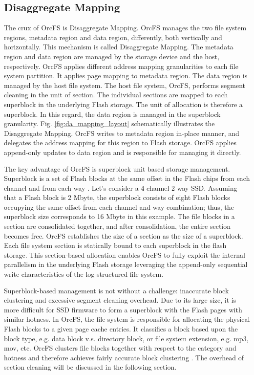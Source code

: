 \documentclass[pageno]{jpaper}
\begin{document}
\subsection{Disaggregate Mapping}
\label{subsec:da_mapping}

The crux of OrcFS is Disaggregate Mapping. OrcFS manages the two file
system regions, metadata region and data region, differently, both
vertically and horizontally. This mechanism is
called Disaggregate Mapping. The metadata region and data region are managed by
the storage device and the host, respectively. OrcFS applies different
address mapping granularities to each file system partition. It applies
page mapping to metadata region. The data region is
managed by the host file system. The host file system, OrcFS, performs
segment cleaning in the unit of section. The individual sections are
mapped to each superblock in the underlying Flash storage. The unit of
allocation is therefore a superblock. In this regard, the data region is
managed in the superblock granularity. Fig. \ref{fig:da_mapping_layout}
schematically illustrates the Disaggregate Mapping. OrcFS writes to 
metadata region in-place manner, and delegates the address mapping for
this region to Flash storage. OrcFS applies append-only updates to data
region and is responsible for managing it directly. 

The key advantage of OrcFS is superblock unit based storage
management.  Superblock is a set of Flash blocks at the same offset in
the Flash chips from each channel and from each way
\cite{park2009sub}.  Let's consider a 4 channel 2 way SSD. Assuming that a
Flash block is 2 Mbyte, the superblock consists of eight Flash blocks
occupying the same offset from each channel and way combination; thus, the
superblock size corresponds to 16 Mbyte in this example. The file
blocks in a section are consolidated together, and after
consolidation, the entire section becomes free. OrcFS establishes the
size of a section as the size of a superblock. Each file system section
is statically bound to each superblock in the flash storage. This
section-based allocation enables OrcFS to fully exploit the internal
parallelism in the underlying Flash storage leveraging the append-only
sequential write characteristics of the log-structured file system.

Superblock-based management is not without a challenge: inaccurate
block clustering and excessive segment cleaning overhead. Due to its
large size, it is more difficult for SSD firmware to form a superblock
with the Flash pages with similar hotness. In OrcFS, the file system is
responsible for allocating the physical Flash blocks to a given page
cache entries. It classifies a block based upon the block type,
e.g. data block v.s. directory block, or file system extension,
e.g. mp3, mov, etc. OrcFS clusters file blocks together with
respect to the category and hotness and therefore achieves fairly
accurate block clustering \cite{ lee2015f2fs, min2012sfs}.  The
overhead of section cleaning will be discussed in the following
section.
\end{document}
